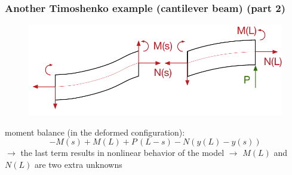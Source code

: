\begin{frame}
  \frametitle{Another Timoshenko example (cantilever beam) (part 2)}
  \vspace{-0.7em}
  \begin{figure}
    \centering
    \includegraphics[width=20cm, keepaspectratio=true]{sections/traditional_beams/images/TimoshenkoCanitleverExample2part2}
  \end{figure}
  
  moment balance (in the deformed configuration):
  \begin{displaymath}
    -M(s) + M(L) + P \, (L-s) - N(y(L)-y(s))
  \end{displaymath}
  $\rightarrow$ the last term results in nonlinear behavior of the model \newline
  $\rightarrow$ $M(L)$ and $N(L)$ are two extra unknowns \newline
  
\end{frame}







